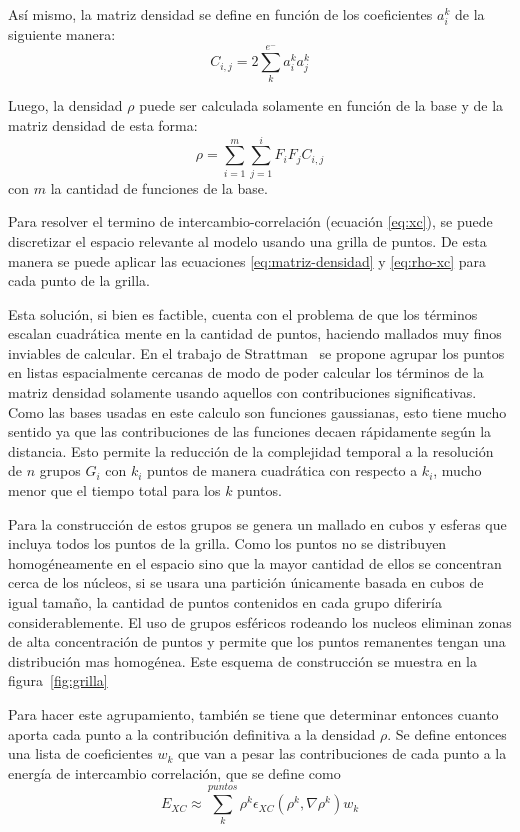 As\'i mismo, la matriz densidad se define en funci\'on de los coeficientes $a^k_i$ de la siguiente manera:
\begin{equation}
  \label{eq:matriz-densidad}
  C_{i,j} = 2 \sum^{e^{-}}_k a^k_i a^k_j
\end{equation}

Luego, la densidad $\rho$ puede ser calculada solamente en funci\'on de la base y de la matriz densidad de esta forma:
\begin{equation}
  \label{eq:rho-xc}
  \rho = \sum^m_{i=1} \sum^i_{j=1} F_i F_j C_{i,j}
\end{equation}
con $m$ la cantidad de funciones de la base.

Para resolver el termino de intercambio-correlaci\'on (ecuaci\'on \ref{eq:xc}), se puede discretizar el espacio relevante al
modelo usando una grilla de puntos. De esta manera se puede aplicar las ecuaciones \ref{eq:matriz-densidad} y \ref{eq:rho-xc}
para cada punto de la grilla.

Esta soluci\'on, si bien es factible, cuenta con el problema de que los t\'erminos escalan cuadr\'atica mente
en la cantidad de puntos, haciendo mallados muy finos inviables de calcular. En el trabajo de Strattman~\cite{Stratmann} se
propone agrupar los puntos en listas espacialmente cercanas de modo de poder calcular los t\'erminos de la matriz densidad
solamente usando aquellos con contribuciones significativas. Como las bases usadas en este calculo son funciones gaussianas,
esto tiene mucho sentido ya que las contribuciones de las funciones decaen r\'apidamente seg\'un la distancia. Esto permite
la reducci\'on de la complejidad temporal a la resoluci\'on de $n$ grupos $G_i$ con $k_i$ puntos de manera cuadr\'atica con respecto a $k_i$,
mucho menor que el tiempo total para los $k$ puntos.

Para la construcci\'on de estos grupos se genera un mallado en cubos y esferas que incluya todos los puntos
de la grilla. Como los puntos no se distribuyen homog\'eneamente en el espacio sino que la mayor cantidad de ellos
se concentran cerca de los n\'ucleos, si se usara una partici\'on \'unicamente basada en cubos de igual tama\~no, la cantidad
de puntos contenidos en cada grupo diferir\'ia considerablemente. El uso de grupos esf\'ericos rodeando
los nucleos eliminan zonas de alta concentraci\'on de puntos y permite que los puntos remanentes
tengan una distribuci\'on mas homog\'enea. Este esquema de construcci\'on se muestra en la figura~\ref{fig:grilla}

Para hacer este agrupamiento, tambi\'en se tiene que determinar entonces cuanto aporta cada punto a la contribuci\'on definitiva
a la densidad $\rho$. Se define entonces una lista de coeficientes $w_k$ que van a pesar las contribuciones de cada punto
a la energ\'ia de intercambio correlaci\'on, que se define como
\begin{equation}
  E_{XC} \approx \sum^{puntos}_k \rho^k \epsilon_{XC} (\rho^k,\nabla \rho^k) w_k
\end{equation}

